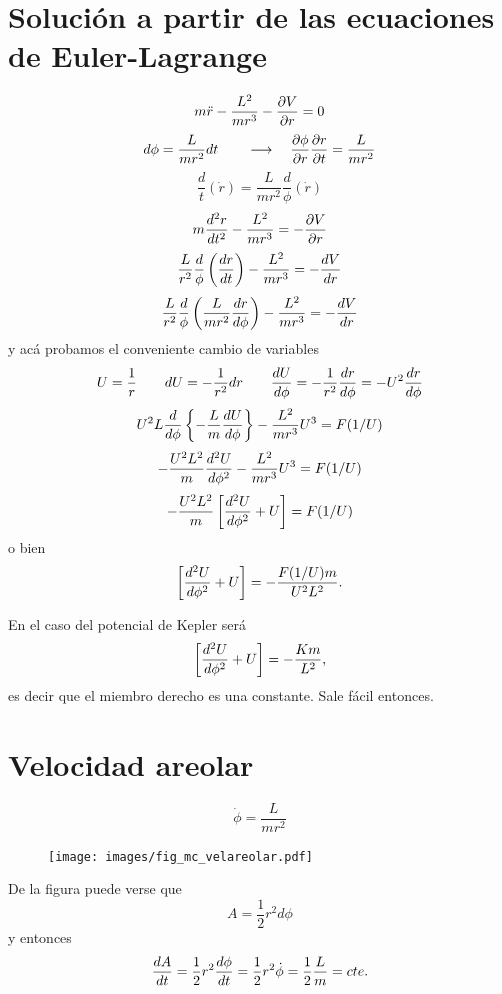 \documentclass[10pt,oneside]{CBFT_book}
\begin{document}
\section{Solución a partir de las ecuaciones de Euler-Lagrange}

\[
	m \ddot{r} -\frac{L^2}{m r^3} -\dpar{V}{r}= 0 
\]
\[
	d \phi = \frac{L}{m r^2} dt \qquad \longrightarrow \quad  \dpar{\phi}{r}\dpar{r}{t}  = \frac{L}{m r^2}
\]
\[
	\frac{d}{t}(\dot{r}) = \frac{L}{m r^2} \frac{d}{\phi}(\dot{r})
\]
\[
	m \dtot[2]{r}{t} -\frac{L^2}{m r^3} = -\dpar{V}{r}
\]
\[
	\frac{L}{r^2} \frac{d}{\phi}\left( \dtot{r}{t} \right) -\frac{L^2}{m r^3} = -\dtot{V}{r}
\]
\[
	\frac{L}{r^2} \frac{d}{\phi}\left( \frac{L}{m r^2}\dtot{r}{\phi} \right) -\frac{L^2}{m r^3} = -\dtot{V}{r}
\]
y acá probamos el conveniente cambio de variables
\[
	U = \frac{1}{r} \qquad dU = -\frac{1}{r^2} dr 
	\qquad \dtot{U}{\phi} = -\frac{1}{r^2}\dtot{r}{\phi} = -U^2\dtot{r}{\phi}
\]
\[
	U^2 L \frac{d}{d\phi} \left\{ -\frac{L}{m}\dtot{U}{\phi} \right\} - \frac{L^2}{m r^3} U^3 = F(1/U)
\]
\[
	- \frac{U^2 L^2}{m} \dtot[2]{U}{\phi} - \frac{L^2}{m r^3} U^3 = F(1/U)
\]
\[
	- \frac{U^2 L^2}{m} \left[ \dtot[2]{U}{\phi} + U \right] = F(1/U)
\]
o bien
\[
	\left[ \dtot[2]{U}{\phi} + U \right] = - \frac{F(1/U) m}{U^2 L^2}. 
\]

En el caso del potencial de Kepler será 
\[
	\left[ \dtot[2]{U}{\phi} + U \right] = - \frac{K m}{L^2},
\]
es decir que el miembro derecho es una constante. Sale fácil entonces.

\section{Velocidad areolar}

\[
	\dot{\phi} = \frac{L}{m r^2}
\]
\begin{figure}[hbt]
	\begin{center}
	\texttt{[image: images/fig\_mc\_velareolar.pdf]}	 
	\end{center}
	\caption{}
\end{figure} 
De la figura puede verse que 
\[
	A = \frac{1}{2} r^2 d\phi 
\]
y  entonces
\[
	\dtot{A}{t} = \frac{1}{2} r^2 \dtot{\phi}{t} = \frac{1}{2} r^2 \dot{\phi} = \frac{1}{2}\frac{L}{m} = cte.
\]
\end{document}
